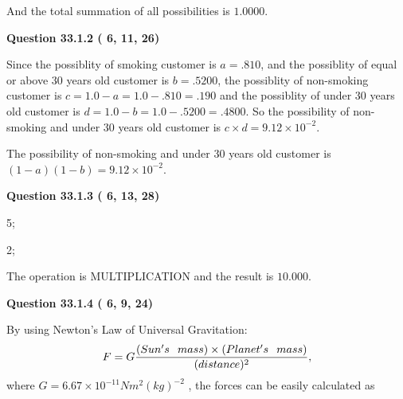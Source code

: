\documentclass[12pt]{article}
\begin{document}
\noindent
 And the total summation of all possibilities is $  %
1.0000 $.
 
 
 
  
\vspace{0.2in}
  
{\textbf{\Large{Question
33.1.2 
 (          6,         11,         26)
}}}
  
  
 
 
\noindent{}

Since the possiblity of  %
smoking customer is $ a =  %
.810 $,
and the possiblity of  %
equal or above 30 years old customer is $ b =  %
.5200 $,
the possiblity of  %
non-smoking customer is $ c = 1.0 - a = 1.0 -
.810
=  %
.190 $ and the possiblity of  %
under 30 years old
customer is $ d = 1.0 - b = 1.0 -  %
.5200 =  %
.4800  $.
So the possibility of  %
 non-smoking and  %
under 30 years old
customer is $ c \times d =  %
9.12 \times 10^{-2} $.
 
 
 
 
 
\noindent{}

The possibility of  %
 non-smoking and  %
under 30 years old
customer is $ (1-a)(1-b) =  %
9.12 \times 10^{-2} $.
 
 
  
\vspace{0.2in}
  
{\textbf{\Large{Question
33.1.3 
 (          6,         13,         28)
}}}
  
  
 
 
\noindent{}

5;
 
2;
 
The operation is  %
MULTIPLICATION and the result is
$ %
10.000$.
 
 
 
  
\vspace{0.2in}
  
{\textbf{\Large{Question
33.1.4 
 (          6,          9,         24)
}}}
  
  
 
 
\noindent{}

By using Newton's Law of Universal Gravitation:
\[
F=G \frac{(Sun's \hspace{0.1in} mass) \times (Planet's \hspace{0.1in} mass)} { (distance)^2},
\]
where
$ G= %
6.67 \times 10^{-11}N m^{2}(kg)^{-2}$ , the forces can be easily calculated as
 
\end{document}
